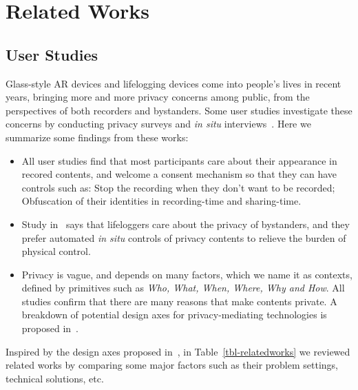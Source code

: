 \chapter{Related Works}\label{sec-related}

\section{User Studies}
Glass-style AR devices and lifelogging devices come into people's lives in recent years, bringing more and more privacy concerns among public, from the perspectives of both recorders and bystanders. Some user studies investigate these concerns by conducting privacy surveys and \emph{in situ} interviews~\cite{denning2014situ,hoyle2014privacy,hoyle2015sensitive,aditya2016pic}. Here we summarize some findings from these works:

\begin{itemize}
  \item All user studies find that most participants care about their appearance in recored contents, and welcome a consent mechanism so that they can have controls such as: Stop the recording when they don't want to be recorded; Obfuscation of their identities in recording-time and sharing-time.
  \item Study in~\cite{hoyle2014privacy} says that lifeloggers care about the privacy of bystanders, and they prefer automated \emph{in situ} controls of privacy contents to relieve the burden of physical control.
  \item Privacy is vague, and depends on many factors, which we name it as contexts, defined by primitives such as \emph{Who, What, When, Where, Why and How}. All studies confirm that there are many reasons that make contents private. A breakdown of potential design axes for privacy-mediating technologies is proposed in~\cite{denning2014situ}.
\end{itemize}

Inspired by the design axes proposed in~\cite{denning2014situ}, in Table~\ref{tbl-relatedworks} we reviewed related works by comparing some major factors such as their problem settings, technical solutions, etc.

\newpage


